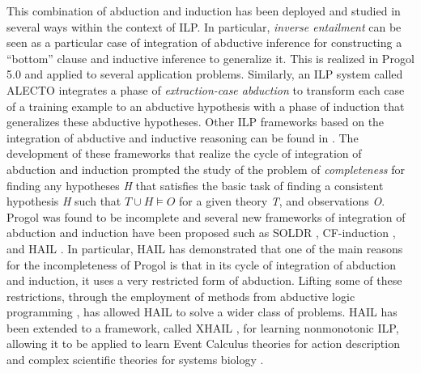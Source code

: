 This combination of abduction and induction has been deployed and studied in several ways within the context of ILP. In particular, \textit{inverse entailment}  can be seen as a particular case of integration of abductive inference for constructing a ``bottom'' clause and inductive inference to generalize it. This is realized in Progol 5.0 and applied to several application problems. Similarly, an ILP system called ALECTO  integrates a phase of \textit{extraction-case abduction} to transform each case of a training example to an abductive hypothesis with a phase of induction that generalizes these abductive hypotheses. Other ILP frameworks based on the integration of abductive and inductive reasoning can be found in .
The development of these frameworks that realize the cycle of integration of abduction and induction prompted the study of the problem of \textit{completeness} for finding any hypotheses \textit{H} that satisfies the basic task of finding a consistent hypothesis \textit{H} such that $T \cup H\models O$ for a given theory \textit{T}, and observations \textit{O}. Progol was found to be incomplete  and several new frameworks of integration of abduction and induction have been proposed such as SOLDR , CF-induction , and HAIL . In particular, HAIL has demonstrated that one of the main reasons for the incompleteness of Progol is that in its cycle of integration of abduction and induction, it uses a very restricted form of abduction. Lifting some of these restrictions, through the employment of methods from abductive logic programming , has allowed HAIL to solve a wider class of problems. HAIL has been extended to a framework, called XHAIL , for learning nonmonotonic ILP, allowing it to be applied to learn Event Calculus theories for action description  and complex scientific theories for systems biology .

